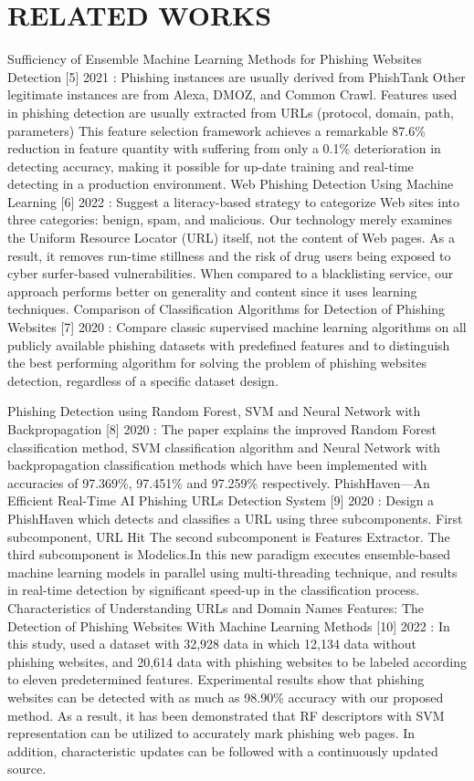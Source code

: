 \documentclass[conference]{IEEEtran}
\begin{document}
\section{RELATED WORKS}
\hspace{.2cm}Sufficiency of Ensemble Machine Learning Methods for Phishing Websites Detection [5] 2021 : Phishing instances are usually derived from PhishTank
Other legitimate instances are from Alexa, DMOZ, and Common Crawl.
Features used in phishing detection are usually extracted from URLs (protocol, domain, path, parameters) This feature selection framework achieves a remarkable 87.6\% reduction in feature quantity with suffering from only a 0.1\% deterioration in detecting accuracy, making it possible for up-date training and real-time detecting in a production environment. Web Phishing Detection Using Machine Learning 
[6] 2022 : Suggest a literacy-based strategy to categorize Web sites into three
categories: benign, spam, and malicious. Our technology merely
examines the Uniform Resource Locator (URL) itself, not the
content of Web pages. As a result, it removes run-time stillness
and the risk of drug users being exposed to cyber surfer-based
vulnerabilities. When compared to a blacklisting service, our
approach performs better on generality and content since it uses
learning techniques. Comparison of Classification Algorithms for Detection of Phishing Websites
[7] 2020 : Compare classic supervised machine learning algorithms on all publicly available phishing datasets with predefined features and to distinguish the best performing algorithm for solving the problem of phishing websites detection, regardless of a specific dataset design.
 
\hspace{.2cm} Phishing Detection using Random Forest, SVM and Neural Network with Backpropagation
[8] 2020 : The paper explains the improved Random Forest classification method, SVM classification algorithm and Neural Network with backpropagation classification methods which have been implemented with accuracies of 97.369\%, 97.451\% and 97.259\% respectively. PhishHaven—An Efficient Real-Time AI Phishing URLs Detection System [9] 2020 : Design a PhishHaven which detects and classifies a URL using three subcomponents.
First subcomponent, URL Hit 
The second subcomponent is Features Extractor.
The third subcomponent is Modelics.In this new paradigm executes ensemble-based machine learning models in parallel using multi-threading technique, and results in real-time detection by significant speed-up in the classification process. Characteristics of Understanding URLs and Domain Names Features: The Detection of Phishing Websites With Machine Learning Methods [10] 2022 : In this study, used a dataset with 32,928 data in which 12,134 data without phishing websites, and 20,614 data with phishing websites to be labeled according to eleven predetermined features.  Experimental results show that phishing websites can be detected with as much as 98.90\% accuracy with our proposed method. As a result, it has been demonstrated that RF descriptors with SVM representation can be utilized to accurately mark phishing web pages. In addition, characteristic updates can be followed with a continuously updated source.
\end{document}
